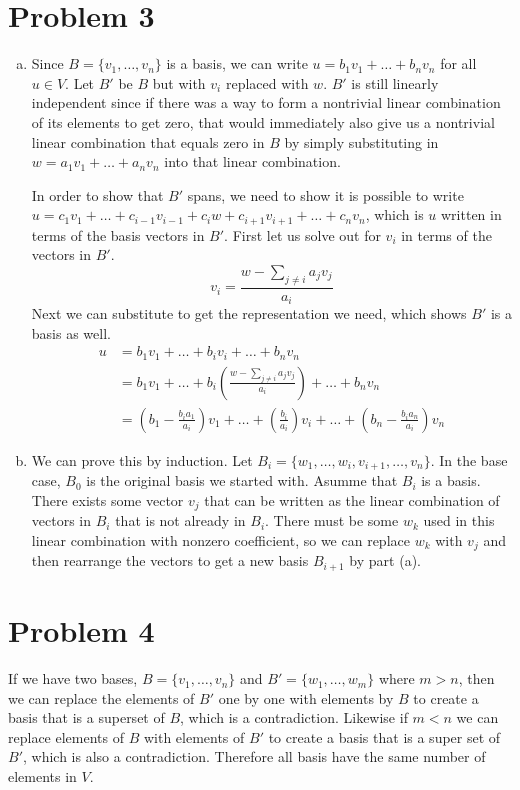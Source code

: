 \documentclass{article}
\begin{document}
\section*{Problem 3}
\begin{enumerate}[(a)]
    \item Since $B = \{v_1, \ldots, v_n\}$ is a basis, we can write 
    $u = b_1v_1 + \ldots + b_nv_n$ for all $u \in V$. 
    Let $B'$ be $B$ but with $v_i$ replaced with $w$.
    $B'$ is still linearly independent since if there was a way to form a nontrivial linear combination of its elements
    to get zero, that would immediately also give us a nontrivial linear combination that equals zero in $B$ 
    by simply substituting in $w = a_1v_1 + \ldots + a_nv_n$ into that linear combination.
    
    In order to show that $B'$ spans,
    we need to show it is possible to write 
    $u = c_1v_1 + \ldots + c_{i-1}v_{i-1} + c_i w + c_{i+1}v_{i+1} + \ldots + c_n v_n$,
    which is $u$ written in terms of the basis vectors in $B'$.
    First let us solve out for $v_i$ in terms of the vectors in $B'$.
    \[
        v_i = \frac{w - \sum_{j\neq i} a_j v_j}{a_i}
    \]
    Next we can substitute to get the representation we need, which shows $B'$ is a basis as well.
    \begin{align*}
        u &= b_1v_1 + \ldots + b_iv_i + \ldots + b_nv_n \\
        &= b_1v_1 + \ldots + b_i\left(\frac{w - \sum_{j\neq i} a_j v_j}{a_i}\right) + \ldots + b_nv_n \\
        &= \left(b_1 - \frac{b_ia_1}{a_i}\right)v_1 + \ldots + \left(\frac{b_i}{a_i}\right)v_i + \ldots +  \left(b_n - \frac{b_ia_n}{a_i}\right)v_n
    \end{align*}
    \item We can prove this by induction. 
    Let $B_i = \{w_1,\ldots,w_i,v_{i+1},\ldots,v_n\}$.
    In the base case, $B_0$ is the original basis we started with.
    Asumme that $B_i$ is a basis.
    There exists some vector $v_j$ that can be written as the linear combination of vectors in $B_i$ that 
    is not already in $B_i$. There must be some $w_k$ used in this linear combination with nonzero coefficient,
    so we can replace $w_k$ with $v_j$ and then rearrange the vectors to get a new basis $B_{i+1}$ by part (a).
\end{enumerate}
\newpage 

\section*{Problem 4}
If we have two bases, $B = \{v_1,\ldots,v_n\}$ and $B'=\{w_1,\ldots,w_m\}$ where $m>n$,
then we can replace the elements of $B'$ one by one with elements by $B$ to create a basis that is a superset of $B$,
which is a contradiction. Likewise if $m<n$ we can replace elements of $B$ with elements of $B'$ to create a basis 
that is a super set of $B'$, which is also a contradiction. 
Therefore all basis have the same number of elements in $V$.
\newpage 
\end{document}
